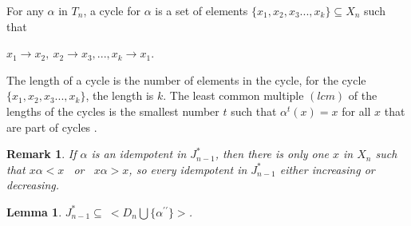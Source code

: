 \documentclass[10pt]{extarticle}
\numberwithin{equation}{section}
\numberwithin{bbb}{section}
\newtheorem{remark}{Remark}[section]
\newtheorem{lemma}{Lemma}[section]
\numberwithin{equation}{section}
\begin{document}
\newpage
For any $\alpha$ in $T_n$, a cycle for $\alpha$ is a set of elements $\{x_1,x_2,x_3...,x_k\} \subseteq X_n$ such that

\begin{center}
    $x_1 \rightarrow x_2,\ x_2 \rightarrow x_3,..., x_k \rightarrow x_1$.
\end{center}
 The length of a cycle is the number of elements in the cycle, for the cycle $\{x_1,x_2,x_3...,x_k\}$, the length is $k$. The least common multiple $(lcm)$ of the lengths of the cycles is the smallest number $t$ such that $\alpha^{t}(x)=x$ for all $x$ that are part of cycles \cite{50}.

\vspace{0.5cm}
\begin{remark}
If $\alpha$ is an idempotent in $J^*_{n-1}$, then there is only one $x$ in $X_n$ such that $x\alpha <x$ \ or \  $x\alpha>x$, so every idempotent in $J^*_{n-1}$ either increasing or decreasing.
\end{remark}

\vspace{0.5cm}
\begin{lemma}
  $J^*_{n-1}\subseteq \ <D_n \bigcup \{\alpha^{\prime\prime}\}>$.
\end{lemma}
\end{document}
